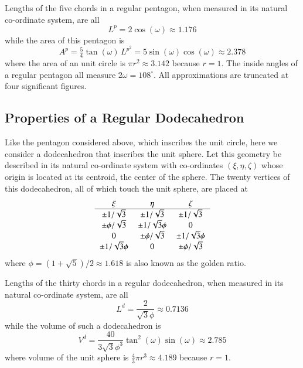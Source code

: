 Lengths of the five chords in a regular pentagon, when measured in its natural co-ordinate system, are all
\begin{equation}
	L^{\!p} = 2 \cos (\omega) \approx 1.176 
	\label{regPentagonLength}
\end{equation}
while the area of this pentagon is
\begin{equation}
	A^p = \tfrac{5}{4} \tan ( \omega ) \, L^{\!p^2} = 
	5 \sin (\omega) \cos (\omega) \approx 2.378
	\label{regPentagonArea}
\end{equation}
where the area of an unit circle is $\pi r^2 \approx 3.142$ because $r=1$.  The
inside angles of a regular pentagon all measure $2\omega = 108^{\circ}$.  All approximations are truncated at four significant figures.

\subsection{Properties of a Regular Dodecahedron}

Like the pentagon considered above, which inscribes the unit circle, here we consider a dodecahedron that inscribes the unit sphere.  Let this geometry be described in its natural co-ordinate system with co-ordinates $(\xi , \eta , \zeta )$ whose origin is located at its centroid, the center of the sphere.  The twenty vertices of this dodecahedron, all of which touch the unit sphere, are placed at
\begin{equation}
\begin{tabular}{ccc}
	$\xi$ & $\eta$ & $\zeta$ \\ \hline
	$\pm 1 / \sqrt{3}$ & $\pm 1 / \sqrt{3}$ & $\pm 1 / \sqrt{3}^{\vphantom{|}}$ \\
	$\pm \phi / \sqrt{3}$ & $\pm 1 / \sqrt{3} \phi$ & 0 \\
	0 & $\pm \phi / \sqrt{3}$ & $\pm 1 / \sqrt{3} \phi$ \\
	$\pm 1 / \sqrt{3} \phi$ & 0 & $\pm \phi / \sqrt{3}$
\end{tabular}
\label{regDodecahedron}
\end{equation}
where $\phi = (1 + \sqrt{5})/2 \approx 1.618$ is also known as the golden ratio.

Lengths of the thirty chords in a regular dodecahedron, when measured in its natural co-ordinate system, are all
\begin{equation}
	L^{\!d} = \frac{2}{\sqrt{3} \phi} \approx 0.7136
	\label{regDodecahedronLength}
\end{equation}
while the volume of such a dodecahedron is
\begin{equation}
	V^d = \frac{40}{3 \sqrt{3} \phi^3} \tan^2 ( \omega ) \sin ( \omega ) \approx 2.785
\label{regDodecahedronVolume}
\end{equation}
where volume of the unit sphere is $\tfrac{4}{3} \pi r^3 \approx 4.189$ because $r=1$.

